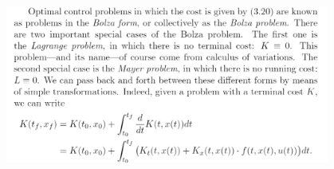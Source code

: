 \documentclass{beamer}
\begin{document}
    \begin{frame}
        \begin{figure}[!htb]
	\centering
	\includegraphics[width=0.95\textwidth]{ch3/Cost2.png}
    \end{figure}
    \end{frame}
\end{document}
